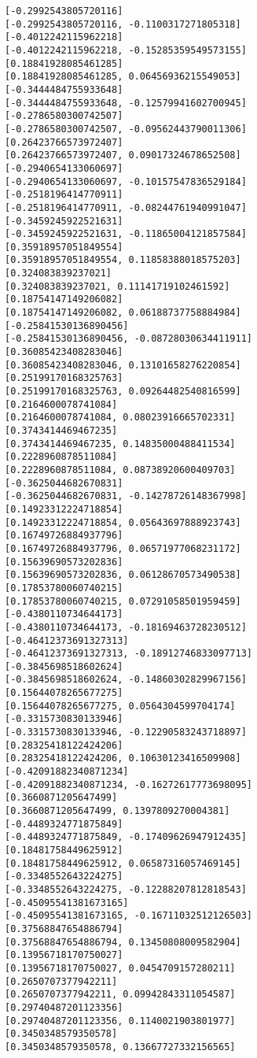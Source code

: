 \documentclass[11pt]{article}
\begin{document}
\begin{Verbatim}[commandchars=\\\{\}]
[-0.2992543805720116]
[-0.2992543805720116, -0.1100317271805318]
[-0.4012242115962218]
[-0.4012242115962218, -0.15285359549573155]
[0.18841928085461285]
[0.18841928085461285, 0.06456936215549053]
[-0.3444484755933648]
[-0.3444484755933648, -0.12579941602700945]
[-0.2786580300742507]
[-0.2786580300742507, -0.09562443790011306]
[0.26423766573972407]
[0.26423766573972407, 0.09017324678652508]
[-0.2940654133060697]
[-0.2940654133060697, -0.10157547836529184]
[-0.2518196414770911]
[-0.2518196414770911, -0.08244761940991047]
[-0.3459245922521631]
[-0.3459245922521631, -0.11865004121857584]
[0.35918957051849554]
[0.35918957051849554, 0.11858388018575203]
[0.324083839237021]
[0.324083839237021, 0.11141719102461592]
[0.18754147149206082]
[0.18754147149206082, 0.06188737758884984]
[-0.25841530136890456]
[-0.25841530136890456, -0.08728030634411911]
[0.36085423408283046]
[0.36085423408283046, 0.13101658276220854]
[0.25199170168325763]
[0.25199170168325763, 0.09264482540816599]
[0.2164600078741084]
[0.2164600078741084, 0.08023916665702331]
[0.3743414469467235]
[0.3743414469467235, 0.14835000488411534]
[0.2228960878511084]
[0.2228960878511084, 0.08738920600409703]
[-0.3625044682670831]
[-0.3625044682670831, -0.14278726148367998]
[0.14923312224718854]
[0.14923312224718854, 0.05643697888923743]
[0.16749726884937796]
[0.16749726884937796, 0.06571977068231172]
[0.15639690573202836]
[0.15639690573202836, 0.06128670573490538]
[0.17853780060740215]
[0.17853780060740215, 0.07291058501959459]
[-0.4380110734644173]
[-0.4380110734644173, -0.18169463728230512]
[-0.46412373691327313]
[-0.46412373691327313, -0.18912746833097713]
[-0.3845698518602624]
[-0.3845698518602624, -0.14860302829967156]
[0.15644078265677275]
[0.15644078265677275, 0.0564304599704174]
[-0.3315730830133946]
[-0.3315730830133946, -0.12290583243718897]
[0.28325418122424206]
[0.28325418122424206, 0.10630123416509908]
[-0.42091882340871234]
[-0.42091882340871234, -0.16272617773698095]
[0.3660871205647499]
[0.3660871205647499, 0.1397809270004381]
[-0.4489324771875849]
[-0.4489324771875849, -0.17409626947912435]
[0.18481758449625912]
[0.18481758449625912, 0.06587316057469145]
[-0.3348552643224275]
[-0.3348552643224275, -0.12288207812818543]
[-0.45095541381673165]
[-0.45095541381673165, -0.16711032512126503]
[0.37568847654886794]
[0.37568847654886794, 0.13450808009582904]
[0.13956718170750027]
[0.13956718170750027, 0.0454709157280211]
[0.2650707377942211]
[0.2650707377942211, 0.09942843311054587]
[0.29740487201123356]
[0.29740487201123356, 0.1140021903801977]
[0.3450348579350578]
[0.3450348579350578, 0.13667727332156565]

\end{Verbatim}
\end{document}
